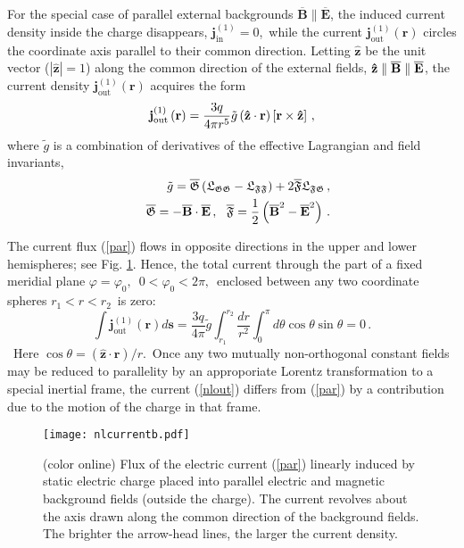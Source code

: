 \documentclass[12pt]{article}
\begin{document}
For the special case of parallel external backgrounds $\overline{\mathbf{B}}%
\parallel \overline{\mathbf{E}}$, the induced current density inside the
charge disappears, $\mathbf{j}_{\mathrm{in}}^{\left( 1\right) }=0$,\ while
the current $\mathbf{j}_{\mathrm{out}}^{\left( 1\right) }\left( \mathbf{r}%
\right) $ circles the coordinate axis parallel to their common direction.
Letting $\mathbf{\hat{z}}$ be the unit vector ($\left\vert \mathbf{\hat{z}}%
\right\vert =1$) along the common direction of the external fields, $\mathbf{%
\hat{z}}\parallel \overline{\mathbf{B}}\parallel \overline{\mathbf{E}}$, the
current density $\mathbf{j}_{\mathrm{out}}^{\left( 1\right) }\left( \mathbf{r%
}\right) $ acquires the form%
\begin{equation}
\mathbf{j}_{\mathrm{out}}^{\left( 1\right) }\left( \mathbf{r}\right) =\frac{%
3q}{4\pi r^{5}}\tilde{g}\left( \mathbf{\hat{z}}\cdot \mathbf{r}\right) \left[
\mathbf{r}\times \mathbf{\hat{z}}\right] \,,  \label{par}
\end{equation}%
where $\tilde{g}$ is a combination of derivatives of the effective
Lagrangian and field invariants,%
\begin{eqnarray}
&&\tilde{g}=\overline{\mathfrak{G}}\left( \mathfrak{L}_{\mathfrak{GG}}-%
\mathfrak{L}_{\mathfrak{FF}}\right) +2\overline{\mathfrak{F}}\mathfrak{L}_{%
\mathfrak{FG}}\,,  \notag \\
&&\overline{\mathfrak{G}}=-\mathbf{\overline{B}}\cdot \overline{\mathbf{E}}%
\,,\ \ \overline{\mathfrak{F}}=\frac{1}{2}\left( \mathbf{\overline{B}}^{2}-%
\overline{\mathbf{E}}^{2}\right) \,.  \label{gtilded}
\end{eqnarray}

The current flux (\ref{par}) flows in opposite directions in the upper and
lower hemispheres; see Fig. \ref{Fig1}. Hence, the total current through the
part of a fixed meridial plane $\varphi =\varphi _{0},$\ $0<\varphi
_{0}<2\pi ,$\ enclosed between any two coordinate spheres $r_{1}<r<r_{2}$\
is zero:%
\begin{equation*}
\int \mathbf{j}_{\mathrm{out}}^{\left( 1\right) }\left( \mathbf{r}\right) d%
\mathbf{s}=\frac{3q}{4\pi }\tilde{g}\int_{r_{1}}^{r_{2}}\frac{dr}{r^{2}}%
\int_{0}^{\pi }d\theta \cos \theta \sin \theta =0\,.
\end{equation*}%
\ Here $\cos \theta =\left( \mathbf{\hat{z}}\cdot \mathbf{r}\right) /r$.\
Once any two mutually non-orthogonal constant fields may be reduced to
parallelity by an approporiate Lorentz transformation to a special inertial
frame, the current (\ref{nlout}) differs from (\ref{par}) by a contribution
due to the motion of the charge in that frame. 
\begin{figure}[th]
\begin{center}
\texttt{[image: nlcurrentb.pdf]}
\end{center}
\caption{(color online) Flux of the electric current (\protect\ref{par})
linearly induced by static electric charge placed into parallel electric and
magnetic background fields (outside the charge). The current revolves about
the axis drawn along the common direction of the background fields. The
brighter the arrow-head lines, the larger the current density.}
\label{Fig1}
\end{figure}
\end{document}
